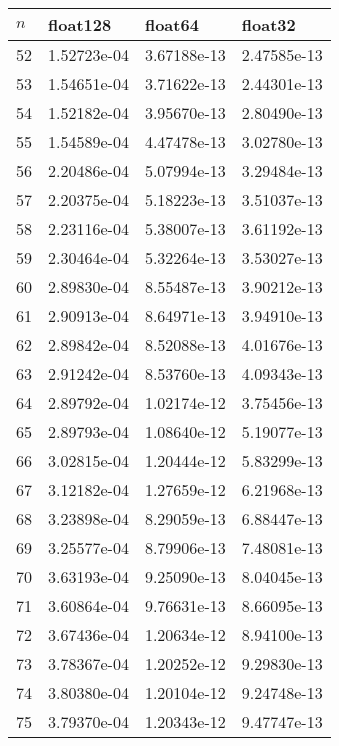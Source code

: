 \documentclass{article}
\begin{document}
\begin{table}[H]
{\begin{tabular}{|l|l|l|l|}
\end{tabular}
\hspace*{0cm}
}
\parbox{.45\linewidth}{
\hspace*{0cm}
\begin{tabular}{|l|l|l|l|}
\hline
$n$ & float128 & float64 & float32 \\ \hline
52 & 1.52723e-04 & 3.67188e-13 & 2.47585e-13 \\ \hline
53 & 1.54651e-04 & 3.71622e-13 & 2.44301e-13 \\ \hline
54 & 1.52182e-04 & 3.95670e-13 & 2.80490e-13 \\ \hline
55 & 1.54589e-04 & 4.47478e-13 & 3.02780e-13 \\ \hline
56 & 2.20486e-04 & 5.07994e-13 & 3.29484e-13 \\ \hline
57 & 2.20375e-04 & 5.18223e-13 & 3.51037e-13 \\ \hline
58 & 2.23116e-04 & 5.38007e-13 & 3.61192e-13 \\ \hline
59 & 2.30464e-04 & 5.32264e-13 & 3.53027e-13 \\ \hline
60 & 2.89830e-04 & 8.55487e-13 & 3.90212e-13 \\ \hline
61 & 2.90913e-04 & 8.64971e-13 & 3.94910e-13 \\ \hline
62 & 2.89842e-04 & 8.52088e-13 & 4.01676e-13 \\ \hline
63 & 2.91242e-04 & 8.53760e-13 & 4.09343e-13 \\ \hline
64 & 2.89792e-04 & 1.02174e-12 & 3.75456e-13 \\ \hline
65 & 2.89793e-04 & 1.08640e-12 & 5.19077e-13 \\ \hline
66 & 3.02815e-04 & 1.20444e-12 & 5.83299e-13 \\ \hline
67 & 3.12182e-04 & 1.27659e-12 & 6.21968e-13 \\ \hline
68 & 3.23898e-04 & 8.29059e-13 & 6.88447e-13 \\ \hline
69 & 3.25577e-04 & 8.79906e-13 & 7.48081e-13 \\ \hline
70 & 3.63193e-04 & 9.25090e-13 & 8.04045e-13 \\ \hline
71 & 3.60864e-04 & 9.76631e-13 & 8.66095e-13 \\ \hline
72 & 3.67436e-04 & 1.20634e-12 & 8.94100e-13 \\ \hline
73 & 3.78367e-04 & 1.20252e-12 & 9.29830e-13 \\ \hline
74 & 3.80380e-04 & 1.20104e-12 & 9.24748e-13 \\ \hline
75 & 3.79370e-04 & 1.20343e-12 & 9.47747e-13 \\ \hline

\end{tabular}}
\end{table}
\end{document}

